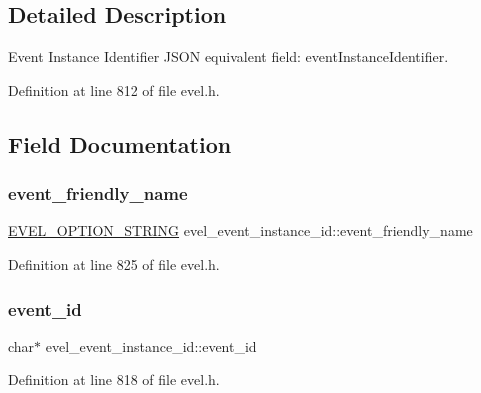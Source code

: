 \subsection{Detailed Description}
Event Instance Identifier J\+S\+ON equivalent field\+: event\+Instance\+Identifier. 

Definition at line 812 of file evel.\+h.



\subsection{Field Documentation}
\hypertarget{structevel__event__instance__id_ad6140447ce4f6f19f037238ded4dc677}{}\label{structevel__event__instance__id_ad6140447ce4f6f19f037238ded4dc677} 
\subsubsection{\texorpdfstring{event\+\_\+friendly\+\_\+name}{event\_friendly\_name}}
{\footnotesize\ttfamily \hyperlink{evel_8h_a0de5113a7b72de93c0c7b644f7ea7ec3}{E\+V\+E\+L\+\_\+\+O\+P\+T\+I\+O\+N\+\_\+\+S\+T\+R\+I\+NG} evel\+\_\+event\+\_\+instance\+\_\+id\+::event\+\_\+friendly\+\_\+name}



Definition at line 825 of file evel.\+h.

\hypertarget{structevel__event__instance__id_a1dc44f941b58ed99cf763002fdb0efd1}{}\label{structevel__event__instance__id_a1dc44f941b58ed99cf763002fdb0efd1} 
\subsubsection{\texorpdfstring{event\+\_\+id}{event\_id}}
{\footnotesize\ttfamily char$\ast$ evel\+\_\+event\+\_\+instance\+\_\+id\+::event\+\_\+id}



Definition at line 818 of file evel.\+h.

\hypertarget{structevel__event__instance__id_ae5220d3ebf64d4f3b7e3199bc5a56126}{}\label{structevel__event__instance__id_ae5220d3ebf64d4f3b7e3199bc5a56126} 
